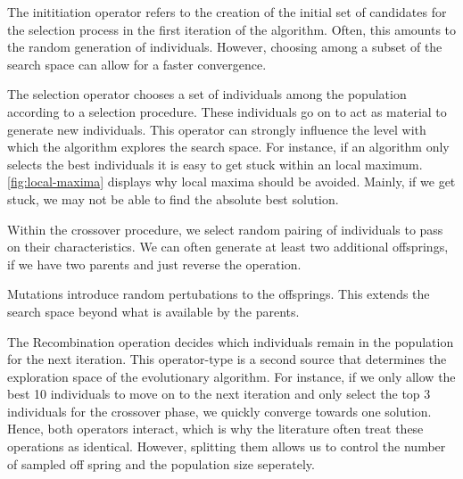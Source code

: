 \documentclass[./../../paper.tex]{subfiles}
\begin{document}
The inititiation operator refers to the creation of the initial set of candidates for the selection process in the first iteration of the algorithm. Often, this amounts to the random generation of individuals.  However, choosing among a subset of the search space can allow for a faster convergence. 

The selection operator chooses a set of individuals among the population according to a selection procedure. These individuals go on to act as material to generate new individuals.  This operator can strongly influence the level with which the algorithm explores the search space. For instance, if an algorithm only selects the best individuals it is easy to get stuck within an local maximum. \autoref{fig:local-maxima} displays why local maxima should be avoided. Mainly, if we get stuck, we may not be able to find the absolute best solution.

Within the crossover procedure, we select random pairing of individuals to pass on their characteristics. We can often generate at least two additional offsprings, if we have two parents and just reverse the operation.

Mutations introduce random pertubations to the offsprings. This extends the search space beyond what is available by the parents.  

The Recombination operation decides which individuals remain in the population for the next iteration\footnotemark[1]. This operator-type is a second source that determines the exploration space of the evolutionary algorithm. For instance, if we only allow the best 10 individuals to move on to the next iteration and only select the top 3 individuals for the crossover phase, we quickly converge towards one solution. Hence, both operators interact, which is why the literature often treat these operations as identical. However, splitting them allows us to control the number of sampled off spring and the population size seperately.  
\end{document}
